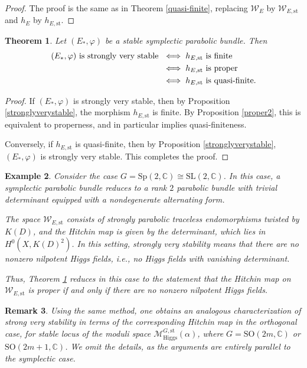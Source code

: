 \documentclass[11pt, reqno]{amsart}
\numberwithin{equation}{section}
\newcommand{\Sp}{\mathrm{Sp}}
\newtheorem{theorem}{Theorem}[section]
\newtheorem{remark}[theorem]{Remark}
\newtheorem{example}[theorem]{Example}
\theoremstyle{definition}
\begin{document}
\begin{proof}
The proof is the same as in Theorem \ref{quasi-finite}, replacing $\mathcal{W}_E$ by $\mathcal{W}_{E,\mathrm{st}}$ and $h_E$ by $h_{E,\mathrm{st}}$.
\end{proof}

\begin{theorem}\label{maintheorem}
Let $(E_*,\varphi)$ be a stable symplectic parabolic bundle. Then
\begin{align*}
(E_*,\varphi) \textnormal{ is strongly very stable }
&\iff h_{E,\mathrm{st}} \textnormal{ is finite} \\
&\iff h_{E,\mathrm{st}} \textnormal{ is proper} \\
&\iff h_{E,\mathrm{st}} \textnormal{ is quasi-finite}.
\end{align*}
\end{theorem}

\begin{proof}
If $(E_*,\varphi)$ is strongly very stable, then by Proposition \ref{stronglyverystable}, the morphism $h_{E,\mathrm{st}}$ is finite. By Proposition \ref{proper2}, this is equivalent to properness, and in particular implies quasi-finiteness.

Conversely, if $h_{E,\mathrm{st}}$ is quasi-finite, then by Proposition \ref{stronglyverystable}, $(E_*,\varphi)$ is strongly very stable. This completes the proof.
\end{proof}

\begin{example}
Consider the case $G=\Sp(2,\mathbb{C}) \cong \mathrm{SL}(2,\mathbb{C})$. In this case, a symplectic parabolic bundle reduces to a rank $2$ parabolic bundle with trivial determinant equipped with a nondegenerate alternating form.

The space $\mathcal{W}_{E,\mathrm{st}}$ consists of strongly parabolic traceless endomorphisms twisted by $K(D)$, and the Hitchin map is given by the determinant, which lies in $H^0(X,K(D)^2)$. In this setting, strongly very stability means that there are no nonzero nilpotent Higgs fields, i.e., no Higgs fields with vanishing determinant.

Thus, Theorem \ref{maintheorem} reduces in this case to the statement that the Hitchin map on $\mathcal{W}_{E,\mathrm{st}}$ is proper if and only if there are no nonzero nilpotent Higgs fields.
\end{example}


\begin{remark}\label{orthogonal}
Using the same method, one obtains an analogous characterization of strong very stability in terms of the corresponding Hitchin map in the orthogonal case, for stable locus of the moduli space $\mathcal{M}^{G,\mathrm{st}}_{\mathrm{Higgs}}(\alpha)$, where $G=\mathrm{SO}(2m,\mathbb{C})$ or $\mathrm{SO}(2m+1,\mathbb{C})$. We omit the details, as the arguments are entirely parallel to the symplectic case.
\end{remark}
\end{document}
